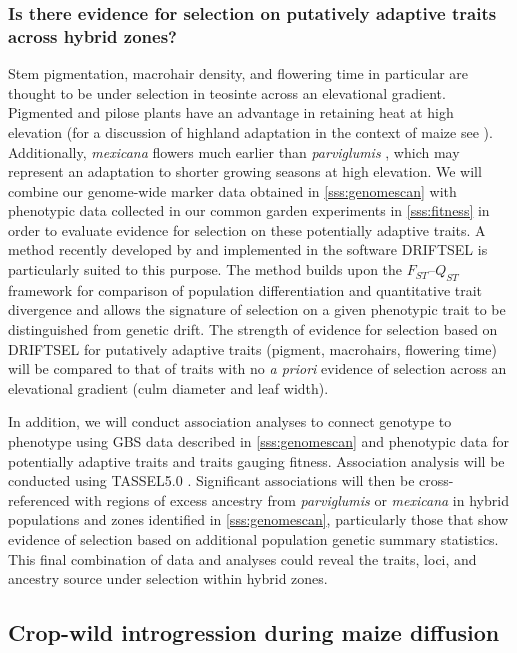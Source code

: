 \subsubsection{Is there evidence for selection on putatively adaptive traits across hybrid zones?}
\label{sss:driftsel}
Stem pigmentation, macrohair density, and flowering time in particular are thought to be under selection in teosinte across an elevational gradient.  Pigmented and pilose plants have an advantage in retaining heat at high elevation (for a discussion of highland adaptation in the context of maize see \citealt{Eagles1994}). Additionally, \emph{mexicana} flowers much earlier than \emph{parviglumis} \citep{Rodriguez2006}, which may represent an adaptation to shorter growing seasons at high elevation. We will combine our genome-wide marker data obtained in \ref{sss:genomescan} with phenotypic data collected in our common garden experiments in \ref{sss:fitness} in order to evaluate evidence for selection on these potentially adaptive traits.  A method recently developed by \citet{Ovaskainen2011} and implemented in the software DRIFTSEL \citep{Karhunen2013} is particularly suited to this purpose.  The method builds upon the $F_{ST}$--$Q_{ST}$ framework for comparison of population differentiation and quantitative trait divergence and allows the signature of selection on a given phenotypic trait to be distinguished from genetic drift.  The strength of evidence for selection based on DRIFTSEL for putatively adaptive traits (pigment, macrohairs, flowering time) will be compared to that of traits with no \emph{a priori} evidence of selection across an elevational gradient (culm diameter and leaf width).

In addition, we will conduct association analyses to connect genotype to phenotype using GBS data described in \ref{sss:genomescan} and phenotypic data for potentially adaptive traits and traits gauging fitness.  Association analysis will be conducted using TASSEL5.0 \citep{Bradbury2007}. Significant associations will then be cross-referenced with regions of excess ancestry from \emph{parviglumis} or \emph{mexicana} in hybrid populations and zones identified in \ref{sss:genomescan}, particularly those that show evidence of selection based on additional population genetic summary statistics.  This final combination of data and analyses could reveal the traits, loci, and ancestry source under selection within hybrid zones.

\subsection{Crop-wild introgression during maize diffusion} \label{ss:genuswide}

